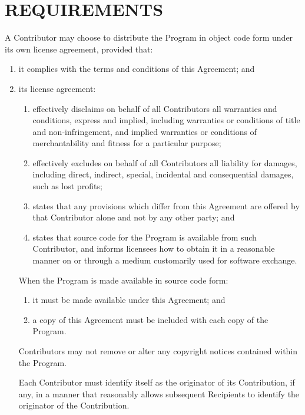 \section{REQUIREMENTS}

A Contributor may choose to distribute the Program in object code form under  its own license agreement, provided that:

\begin{enumerate}%
\item
it complies with the terms and conditions of this Agreement; and

\item
its license agreement:

\begin{enumerate}%
\item
effectively disclaims on behalf of all Contributors all warranties and  conditions, express and implied, including warranties or conditions of title  and non-infringement, and implied warranties or conditions of merchantability  and fitness for a particular purpose;

\item
effectively excludes on behalf of all Contributors all liability for  damages, including direct, indirect, special, incidental and consequential  damages, such as lost profits;

\item
states that any provisions which differ from this Agreement are offered  by that Contributor alone and not by any other party; and

\item
states that source code for the Program is available from such  Contributor, and informs licensees how to obtain it in a reasonable manner on  or through a medium customarily used for software exchange.
\end{enumerate}


When the Program is made available in source code form:

\begin{enumerate}%
\item
it must be made available under this Agreement; and
\item
a copy of this Agreement must be included with each copy of the Program.
\end{enumerate}

Contributors may not remove or alter any copyright notices contained within  the Program.


Each Contributor must identify itself as the originator of its Contribution,  if any, in a manner that reasonably allows subsequent Recipients to identify  the originator of the Contribution.
\end{enumerate}

